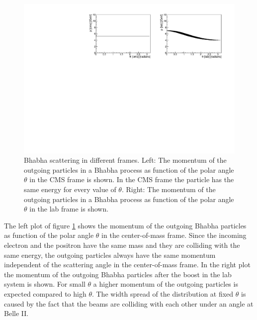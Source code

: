\documentclass[a4paper,11pt,twosided,final,german,openbib,pdftex,listof=totoc,bibliography=totoc]{scrbook}
\begin{document}
\begin{figure}[h!]
	\centering
	\includegraphics[width=\textwidth]{Bilder/CThetaP}
	\caption[Momentum As Function Of $\theta$ In The CMS And LAB Frame]{Bhabha scattering in different frames. Left: The momentum of the outgoing particles in a Bhabha process as function of the polar angle $\theta$ in the CMS frame is shown. In the CMS frame the particle has the same energy for every value of $\theta$. Right: The momentum of the outgoing particles in a Bhabha process as function of the polar angle $\theta$ in the lab frame is shown.}
	\label{fig:Belle IIMomentum}
	
\end{figure}

The left plot of figure \ref{fig:Belle IIMomentum} shows the momentum of the outgoing Bhabha particles as function of the polar angle $\theta$ in the center-of-mass frame. Since the incoming electron and the positron have the same mass and they are colliding with the same energy, the outgoing particles always have the same momentum independent of the scattering angle in the center-of-mass frame. In the right plot the momentum of the outgoing Bhabha particles after the boost in the lab system is shown. For small $\theta$ a higher momentum of the outgoing particles is expected compared to high $\theta$. The width spread of the distribution at fixed $\theta$ is caused by the fact that the beams are colliding with each other under an angle at Belle II.
\end{document}
